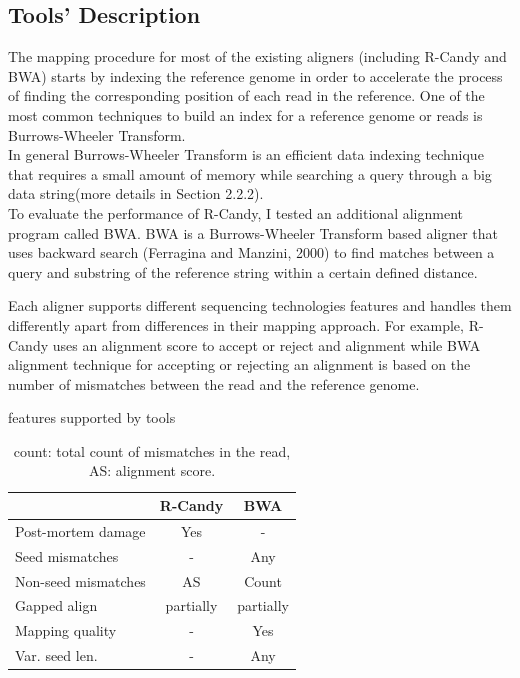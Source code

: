 \documentclass[11pt,a4paper]{report}
\begin{document}
\subsection{Tools' Description} \label{Tools' Description}

The mapping procedure for most of the existing aligners (including R-Candy and BWA) starts by indexing the reference genome in order to accelerate the process of finding the corresponding position of each read in the reference.
One of the most common techniques to build an index for a reference genome or reads is Burrows-Wheeler Transform.
\\
In general Burrows-Wheeler Transform is an efficient data indexing technique that requires a small amount of memory while searching a query through a big data string(more details in Section 2.2.2).\\

To evaluate the performance of R-Candy, I tested an additional
alignment program called BWA.
BWA is a Burrows-Wheeler Transform based aligner that uses backward search (Ferragina and Manzini, 2000) 
to find matches  between a query and substring of the reference string within a certain defined distance\cite{bwa}.

Each aligner supports different sequencing technologies features and handles them differently apart from differences in their mapping approach.
For example, R-Candy uses an alignment score to accept or reject and alignment while BWA alignment technique for accepting or rejecting an alignment is based on the number of mismatches between the read and the reference genome\cite{bwa}.


\begin{table}[H]
 \centering
 \caption{features supported by tools}
  \begin{tabular}{ |  p{4cm} | c | c |}
   \hline 
  				  	   & \textbf{R-Candy} &\textbf{ BWA}  \\ \hline
  	   Post-mortem damage & Yes & - \\	  	   
       Seed mismatches &  -  & Any  \\
   Non-seed mismatches & AS  & Count  \\ 
          Gapped align & partially & partially \\ 
       Mapping quality & - & Yes  \\
       Var. seed len.  & -   &  Any \\
       \hline
      \end{tabular}
	\caption*{count: total count of mismatches in the read, AS: alignment score. 
	 }
 	\label{features}
\end{table}
\end{document}

